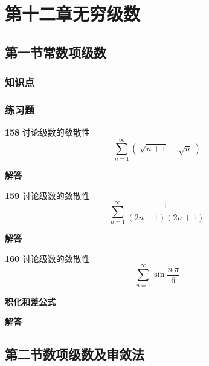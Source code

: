 \documentclass[a4paper,10pt]{article} %
\begin{document}

\textheight

\newpage
\section{第十二章\quad 无穷级数}
\subsection{第一节\quad 常数项级数}
\subsubsection{知识点}
\subsubsection{练习题}
\par\noindent \textbf{158} \quad 讨论级数的敛散性
$$\sum_{n=1}^{\infty}\left(\,\sqrt{n+1}-\sqrt{n}\,\right)$$
\par\noindent \textbf{ 解答}




\textheight


\par\noindent \textbf{159} \quad 讨论级数的敛散性
$$\sum_{n=1}^{\infty}\frac{1}{(2n-1)(2n+1)}$$
\par\noindent \textbf{ 解答}




\textheight


\par\noindent \textbf{160} \quad 讨论级数的敛散性
$$\sum_{n=1}^{\infty}\sin\frac{n\,\pi}{6}$$
\par\noindent \textbf{ 积化和差公式}
\par\noindent \textbf{ 解答}




\textheight

\newpage
\subsection{第二节\quad 数项级数及审敛法}
\end{document}
